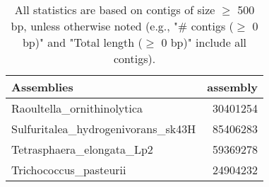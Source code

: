 \documentclass[12pt,a4paper]{article}
\begin{document}
\begin{table}[ht]
\begin{center}
\caption{All statistics are based on contigs of size $\geq$ 500 bp, unless otherwise noted (e.g., "\# contigs ($\geq$ 0 bp)" and "Total length ($\geq$ 0 bp)" include all contigs).}
\begin{tabular}{|l*{1}{|r}|}
\hline
Assemblies & assembly \\ \hline
Raoultella\_ornithinolytica & 30401254 \\ \hline
Sulfuritalea\_hydrogenivorans\_sk43H & 85406283 \\ \hline
Tetrasphaera\_elongata\_Lp2 & 59369278 \\ \hline
Trichococcus\_pasteurii & 24904232 \\ \hline
\end{tabular}
\end{center}
\end{table}
\end{document}
